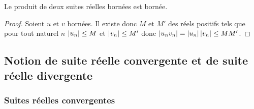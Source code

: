 \begin{prop}
  Le produit de deux suites réelles bornées est bornée.
\end{prop}
\begin{proof}
  Soient $u$ et $v$ bornées. Il existe donc $M$ et $M'$ des réels positifs tels que pour tout naturel $n$ $\left\lvert u_n\right\rvert\leq M$ et $\left\lvert v_n\right\rvert\leq M'$ donc $\left\lvert u_n v_n\right\rvert=\left\lvert u_n\right\rvert\left\lvert v_n\right\rvert\leq MM'$. 
\end{proof}

\subsection{Notion de suite réelle convergente et de suite réelle divergente}

\subsubsection{Suites réelles convergentes}


